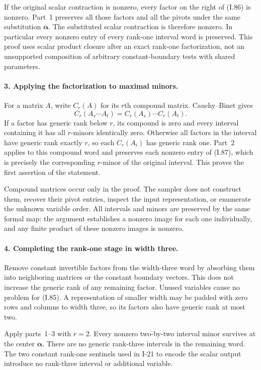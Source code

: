 If the original scalar contraction is nonzero, every factor on the
right of (I.86) is nonzero. Part~1 preserves all those factors and
all the pivots under the same substitution $\boldsymbol\alpha$.
The substituted scalar contraction is therefore nonzero. In
particular every nonzero entry of every rank-one interval word is
preserved. This proof uses scalar product closure after an exact
rank-one factorization, not an unsupported composition of arbitrary
constant-boundary tests with shared parameters.

\paragraph{3. Applying the factorization to maximal minors.}
For a matrix $A$, write $C_r(A)$ for its $r$th compound matrix.
Cauchy--Binet gives
\[
 C_r(A_s\cdots A_t)=C_r(A_s)\cdots C_r(A_t).
 \tag{I.87}
\]
If a factor has generic rank below $r$, its compound is zero and
every interval containing it has all $r$-minors identically zero.
Otherwise all factors in the interval have generic rank exactly
$r$, so each $C_r(A_i)$ has generic rank one. Part~2 applies to
this compound word and preserves each nonzero entry of (I.87),
which is precisely the corresponding $r$-minor of the original
interval. This proves the first assertion of the statement.

Compound matrices occur only in the proof. The sampler does not
construct them, recover their pivot entries, inspect the input
representation, or enumerate the unknown variable order. All
intervals and minors are preserved by the same formal map: the
argument establishes a nonzero image for each one individually,
and any finite product of these nonzero images is nonzero.

\paragraph{4. Completing the rank-one stage in width three.}
Remove constant invertible factors from the width-three word by
absorbing them into neighboring matrices or the constant boundary
vectors. This does not increase the generic rank of any remaining
factor. Unused variables cause no problem for (I.85). A representation
of smaller width may be padded with zero rows and columns to width
three, so its factors also have generic rank at most two.

Apply parts~1--3 with $r=2$. Every nonzero two-by-two interval
minor survives at the center $\boldsymbol\alpha$. There are no
generic rank-three intervals in the remaining word. The two
constant rank-one sentinels used in I-21 to encode the scalar
output introduce no rank-three interval or additional variable.

